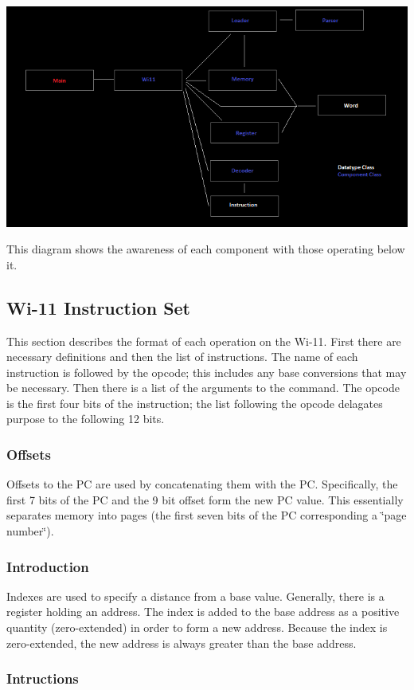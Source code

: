 \begin{DoxyImage}
\includegraphics[width=\textwidth]{software_interaction.png}
\caption{This diagram shows the awareness of each component with those operating below it.}
\end{DoxyImage}
\hypertarget{index_instructions}{}\subsection{Wi-\/11 Instruction Set}\label{index_instructions}
\begin{DoxyParagraph}{}
This section describes the format of each operation on the Wi-\/11. First there are necessary definitions and then the list of instructions. The name of each instruction is followed by the opcode; this includes any base conversions that may be necessary. Then there is a list of the arguments to the command. The opcode is the first four bits of the instruction; the list following the opcode delagates purpose to the following 12 bits.
\end{DoxyParagraph}
\hypertarget{index_offset}{}\subsubsection{Offsets}\label{index_offset}
Offsets to the PC are used by concatenating them with the PC. Specifically, the first 7 bits of the PC and the 9 bit offset form the new PC value. This essentially separates memory into pages (the first seven bits of the PC corresponding a \char`\"{}page number\char`\"{}).\hypertarget{index_index}{}\subsubsection{Introduction}\label{index_index}
Indexes are used to specify a distance from a base value. Generally, there is a register holding an address. The index is added to the base address as a positive quantity (zero-\/extended) in order to form a new address. Because the index is zero-\/extended, the new address is always greater than the base address.\hypertarget{index_inst}{}\subsubsection{Intructions}\label{index_inst}
